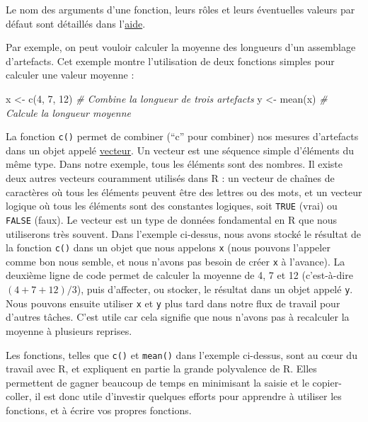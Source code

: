 \documentclass[
  french,
]{scrbook}
\newenvironment{Shaded}{\begin{snugshade}}{\end{snugshade}}
\newcommand{\CommentTok}[1]{\textcolor[rgb]{0.56,0.35,0.01}{\textit{#1}}}
\newcommand{\DecValTok}[1]{\textcolor[rgb]{0.00,0.00,0.81}{#1}}
\newcommand{\FunctionTok}[1]{\textcolor[rgb]{0.00,0.00,0.00}{#1}}
\newcommand{\NormalTok}[1]{#1}
\newcommand{\OtherTok}[1]{\textcolor[rgb]{0.56,0.35,0.01}{#1}}
\begin{document}
\begin{tcolorbox}[fonttitle=\sffamily\bfseries\large,title=Conseil,colframe=darkcyan]

Le nom des arguments d'une fonction, leurs rôles et leurs éventuelles valeurs par défaut sont détaillés dans l'\protect\hyperlink{aide}{aide}.

\end{tcolorbox}

Par exemple, on peut vouloir calculer la moyenne des longueurs d'un assemblage d'artefacts. Cet exemple montre l'utilisation de deux fonctions simples pour calculer une valeur moyenne :

\begin{Shaded}
\begin{Highlighting}[]
\NormalTok{x }\OtherTok{\textless{}{-}} \FunctionTok{c}\NormalTok{(}\DecValTok{4}\NormalTok{, }\DecValTok{7}\NormalTok{, }\DecValTok{12}\NormalTok{) }\CommentTok{\# Combine la longueur de trois artefacts}
\NormalTok{y }\OtherTok{\textless{}{-}} \FunctionTok{mean}\NormalTok{(x)     }\CommentTok{\# Calcule la longueur moyenne}
\end{Highlighting}
\end{Shaded}

La fonction \texttt{c()} permet de combiner (``c'' pour combiner) nos mesures d'artefacts dans un objet appelé \protect\hyperlink{r-atomic}{vecteur}. Un vecteur est une séquence simple d'éléments du même type. Dans notre exemple, tous les éléments sont des nombres. Il existe deux autres vecteurs couramment utilisés dans R : un vecteur de chaînes de caractères où tous les éléments peuvent être des lettres ou des mots, et un vecteur logique où tous les éléments sont des constantes logiques, soit \texttt{TRUE} (vrai) ou \texttt{FALSE} (faux). Le vecteur est un type de données fondamental en R que nous utiliserons très souvent. Dans l'exemple ci-dessus, nous avons stocké le résultat de la fonction \texttt{c()} dans un objet que nous appelons \texttt{x} (nous pouvons l'appeler comme bon nous semble, et nous n'avons pas besoin de créer \texttt{x} à l'avance). La deuxième ligne de code permet de calculer la moyenne de 4, 7 et 12 (c'est-à-dire \((4 + 7 + 12)/3\)), puis d'affecter, ou stocker, le résultat dans un objet appelé \texttt{y}. Nous pouvons ensuite utiliser \texttt{x} et \texttt{y} plus tard dans notre flux de travail pour d'autres tâches. C'est utile car cela signifie que nous n'avons pas à recalculer la moyenne à plusieurs reprises.

Les fonctions, telles que \texttt{c()} et \texttt{mean()} dans l'exemple ci-dessus, sont au cœur du travail avec R, et expliquent en partie la grande polyvalence de R. Elles permettent de gagner beaucoup de temps en minimisant la saisie et le copier-coller, il est donc utile d'investir quelques efforts pour apprendre à utiliser les fonctions, et à écrire vos propres fonctions.
\end{document}
